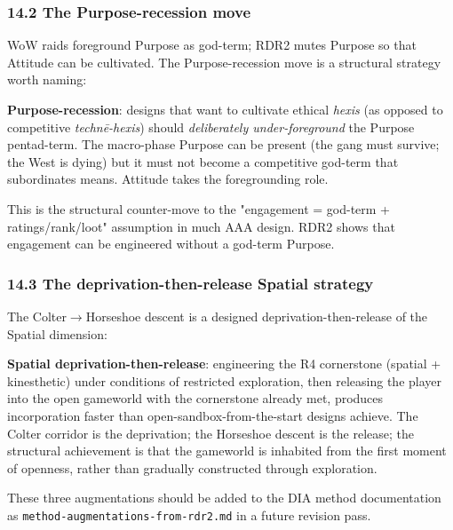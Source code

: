 \documentclass[11pt]{report}
\begin{document}
\subsubsection{14.2 The Purpose-recession move}


WoW raids foreground Purpose as god-term; RDR2 mutes Purpose so that Attitude can be cultivated. The Purpose-recession move is a structural strategy worth naming:


\begin{diabox}
\textbf{Purpose-recession}: designs that want to cultivate ethical \textit{hexis} (as opposed to competitive \textit{technē-hexis}) should \textit{deliberately under-foreground} the Purpose pentad-term. The macro-phase Purpose can be present (the gang must survive; the West is dying) but it must not become a competitive god-term that subordinates means. Attitude takes the foregrounding role.

\end{diabox}


This is the structural counter-move to the "engagement = god-term + ratings/rank/loot" assumption in much AAA design. RDR2 shows that engagement can be engineered without a god-term Purpose.


\subsubsection{14.3 The deprivation-then-release Spatial strategy}


The Colter$\rightarrow$\allowbreak Horseshoe descent is a designed deprivation-then-release of the Spatial dimension:


\begin{diabox}
\textbf{Spatial deprivation-then-release}: engineering the R4 cornerstone (spatial + kinesthetic) under conditions of restricted exploration, then releasing the player into the open gameworld with the cornerstone already met, produces incorporation faster than open-sandbox-from-the-start designs achieve. The Colter corridor is the deprivation; the Horseshoe descent is the release; the structural achievement is that the gameworld is inhabited from the first moment of openness, rather than gradually constructed through exploration.

\end{diabox}


These three augmentations should be added to the DIA method documentation as \texttt{method-\discretionary{}{}{}augmentations-\discretionary{}{}{}from-\discretionary{}{}{}rdr2.\discretionary{}{}{}md} in a future revision pass.
\end{document}

